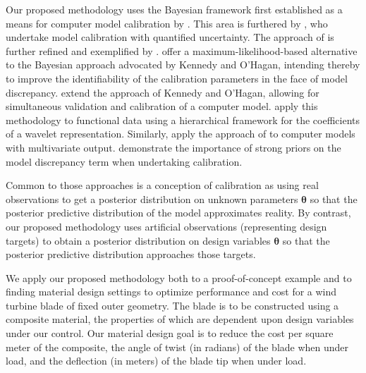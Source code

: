 \documentclass[12pt]{article}
\begin{document}
%
Our proposed methodology uses the Bayesian framework first established as a means for computer model calibration by \cite{Kennedy2001}.
%
This area is furthered by \cite{Higdon2004}, who undertake model calibration with quantified uncertainty.
%
%
The approach of \cite{Higdon2004} is further refined and exemplified by \cite{Williams2006}.
%
\cite{Loeppky2006} offer a maximum-likelihood-based alternative to the Bayesian approach advocated by Kennedy and O'Hagan, intending thereby to improve the identifiability of the calibration parameters in the face of model discrepancy.
%
\cite{Bayarri2007} extend the approach of Kennedy and O'Hagan, allowing for simultaneous validation and calibration of a computer model. %
%
\cite{Bayarri} apply this methodology to functional data using a hierarchical framework for the coefficients of a wavelet representation.
%
Similarly, \cite{Paulo2012} apply the approach of \cite{Bayarri2007} to computer models with multivariate output.
%
\cite{Brynjarsdottir2014} demonstrate the importance of strong priors on the model discrepancy term when undertaking calibration.
%

%
Common to those approaches is a conception of calibration as using real observations to get a posterior distribution on unknown parameters $\boldsymbol\theta$ so that the posterior predictive distribution of the model approximates reality.
%
By contrast, our proposed methodology uses artificial observations (representing design targets) to obtain a posterior distribution on design variables $\boldsymbol\theta$ so that the posterior predictive distribution approaches those targets.
%
%
%

%
We apply our proposed methodology both to a proof-of-concept example and to finding material design settings to optimize performance and cost for a wind turbine blade of fixed outer geometry.
%
The blade is to be constructed using a composite material, the properties of which are dependent upon design variables under our control.
%
%
Our material design goal is to reduce the cost per square meter of the composite, the angle of twist (in radians) of the blade when under load, and the deflection (in meters) of the blade tip when under load.
%
\end{document}

